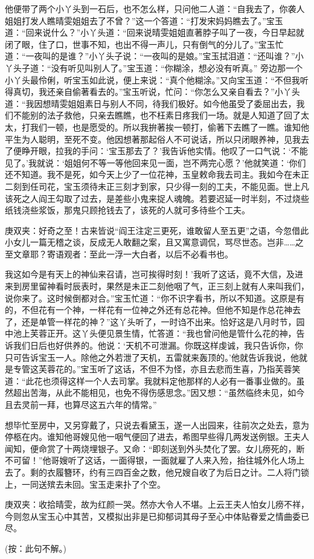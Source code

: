\begin{parag}
    他便带了两个小丫头到一石后，也不怎么样，只问他二人道：“自我去了，你袭人姐姐打发人瞧晴雯姐姐去了不曾？”这一个答道：“打发宋妈妈瞧去了。”宝玉道：“回来说什么？”小丫头道：“回来说晴雯姐姐直著脖子叫了一夜，今日早起就闭了眼，住了口，世事不知，也出不得一声儿，只有倒气的分儿了。”宝玉忙道：“一夜叫的是谁？”小丫头子说：“一夜叫的是娘。”宝玉拭泪道：“还叫谁？”小丫头子道：“没有听见叫别人了。”宝玉道：“你糊涂，想必没有听真。” 旁边那一个小丫头最伶俐，听宝玉如此说，便上来说：“真个他糊涂。”又向宝玉道：“不但我听得真切，我还亲自偷著看去的。”宝玉听说，忙问：“你怎么又亲自看去？”小丫头道：“我因想晴雯姐姐素日与别人不同，待我们极好。如今他虽受了委屈出去，我们不能别的法子救他，只亲去瞧瞧，也不枉素日疼我们一场。就是人知道了回了太太，打我们一顿，也是愿受的。所以我拚著挨一顿打，偷著下去瞧了一瞧。谁知他平生为人聪明，至死不变。他因想著那起俗人不可说话，所以只闭眼养神，见我去了便睁开眼，拉我的手问：‘宝玉那去了？’我告诉他实情。他叹了一口气说：‘不能见了。’我就说：‘姐姐何不等一等他回来见一面，岂不两完心愿？’他就笑道：‘你们还不知道。我不是死，如今天上少了一位花神，玉皇敕命我去司主。我如今在未正二刻到任司花，宝玉须待未正三刻才到家，只少得一刻的工夫，不能见面。世上凡该死之人阎王勾取了过去，是差些小鬼来捉人魂魄。若要迟延一时半刻，不过烧些纸钱浇些浆饭，那鬼只顾抢钱去了，该死的人就可多待些个工夫。\begin{note}庚双夹：好奇之至！古来皆说“阎王注定三更死，谁敢留人至五更”之语，今忽借此小女儿一篇无稽之谈，反成无人敢翻之案，且又寓意调侃，骂尽世态。岂非……之至文章耶？寄语观者：至此一浮一大白者，以后不必看书也。\end{note}我这如今是有天上的神仙来召请，岂可挨得时刻！’我听了这话，竟不大信，及进来到房里留神看时辰表时，果然是未正二刻他咽了气，正三刻上就有人来叫我们，说你来了。这时候倒都对合。”宝玉忙道：“你不识字看书，所以不知道。这原是有的，不但花有一个神，一样花有一位神之外还有总花神。但他不知是作总花神去了，还是单管一样花的神？”这丫头听了，一时诌不出来。恰好这是八月时节，园中池上芙蓉正开。这丫头便见景生情，忙答道：“我也曾问他是管什么花的神，告诉我们日后也好供养的。他说：‘天机不可泄漏。你既这样虔诚，我只告诉你，你只可告诉宝玉一人。除他之外若泄了天机，五雷就来轰顶的。’他就告诉我说，他就是专管这芙蓉花的。”宝玉听了这话，不但不为怪，亦且去悲而生喜，乃指芙蓉笑道：“此花也须得这样一个人去司掌。我就料定他那样的人必有一番事业做的。虽然超出苦海，从此不能相见，也免不得伤感思念。”因又想：“虽然临终未见，如今且去灵前一拜，也算尽这五六年的情常。”
\end{parag}


\begin{parag}
    想毕忙至房中，又另穿戴了，只说去看黛玉，遂一人出园来，往前次之处去，意为停柩在内。谁知他哥嫂见他一咽气便回了进去，希图早些得几两发送例银。王夫人闻知，便命赏了十两烧埋银子。又命：“即刻送到外头焚化了罢。女儿痨死的，断不可留！”他哥嫂听了这话，一面得银，一面就雇了人来入殓，抬往城外化人场上去了。剩的衣履簪环，约有三四百金之数，他兄嫂自收了为后日之计。二人将门锁上，一同送殡去未回。宝玉走来扑了个空。\begin{note}庚双夹：收拾晴雯，故为红颜一哭。然亦大令人不堪。上云王夫人怕女儿痨不祥，今则忽从宝玉心中其苦，又模拟出非是已抑郁词其母子至心中体贴眷爱之情曲委已尽。\end{note}(按：此句不解。)
\end{parag}


